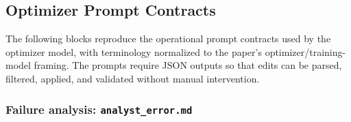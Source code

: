 


\subsection{Optimizer Prompt Contracts}
\label{app:prompt_contracts}

The following blocks reproduce the operational prompt contracts used by the optimizer model, with terminology normalized to the paper's optimizer/training-model framing. The prompts require JSON outputs so that edits can be parsed, filtered, applied, and validated without manual intervention.

\subsubsection{Failure analysis: \texttt{analyst\_error.md}}

